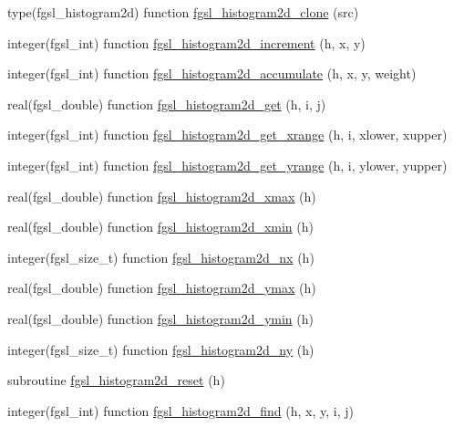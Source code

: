 \begin{DoxyCompactItemize}
\item 
type(fgsl\+\_\+histogram2d) function \hyperlink{histogram_8finc_a9604948b71d92f4538af93c78e588094}{fgsl\+\_\+histogram2d\+\_\+clone} (src)
\item 
integer(fgsl\+\_\+int) function \hyperlink{histogram_8finc_a952f7e1fd0f3c40bd6a7e944b276a16e}{fgsl\+\_\+histogram2d\+\_\+increment} (h, x, y)
\item 
integer(fgsl\+\_\+int) function \hyperlink{histogram_8finc_a3a6eeec0c1b7597dbdf4d1ab4cafbeed}{fgsl\+\_\+histogram2d\+\_\+accumulate} (h, x, y, weight)
\item 
real(fgsl\+\_\+double) function \hyperlink{histogram_8finc_a2bf0d6457cd1a1ea900d74e0a3eee4d6}{fgsl\+\_\+histogram2d\+\_\+get} (h, i, j)
\item 
integer(fgsl\+\_\+int) function \hyperlink{histogram_8finc_af5344e677a177dafbbae2dbeef296aec}{fgsl\+\_\+histogram2d\+\_\+get\+\_\+xrange} (h, i, xlower, xupper)
\item 
integer(fgsl\+\_\+int) function \hyperlink{histogram_8finc_ae8df4a522731cb9a11e12f5b67477d73}{fgsl\+\_\+histogram2d\+\_\+get\+\_\+yrange} (h, i, ylower, yupper)
\item 
real(fgsl\+\_\+double) function \hyperlink{histogram_8finc_ad4a38fb97da9239b35d7cb87a5bfd317}{fgsl\+\_\+histogram2d\+\_\+xmax} (h)
\item 
real(fgsl\+\_\+double) function \hyperlink{histogram_8finc_a9e077ca4a5ae72020dc7c4888686cf11}{fgsl\+\_\+histogram2d\+\_\+xmin} (h)
\item 
integer(fgsl\+\_\+size\+\_\+t) function \hyperlink{histogram_8finc_aaeab41d83342219214c6a491f1a787c1}{fgsl\+\_\+histogram2d\+\_\+nx} (h)
\item 
real(fgsl\+\_\+double) function \hyperlink{histogram_8finc_adc8f77aa4dcb1669c67f89007d0dcd88}{fgsl\+\_\+histogram2d\+\_\+ymax} (h)
\item 
real(fgsl\+\_\+double) function \hyperlink{histogram_8finc_ae0c415b04bd1b13d137b79cdf58c7bb4}{fgsl\+\_\+histogram2d\+\_\+ymin} (h)
\item 
integer(fgsl\+\_\+size\+\_\+t) function \hyperlink{histogram_8finc_a38af849a97c19f225fec10a9eafb2d7b}{fgsl\+\_\+histogram2d\+\_\+ny} (h)
\item 
subroutine \hyperlink{histogram_8finc_a386fdbb01672ba3530a25e570706a3da}{fgsl\+\_\+histogram2d\+\_\+reset} (h)
\item 
integer(fgsl\+\_\+int) function \hyperlink{histogram_8finc_a11b26e23f4e370a0c15abe24db476a71}{fgsl\+\_\+histogram2d\+\_\+find} (h, x, y, i, j)

\end{DoxyCompactItemize}
